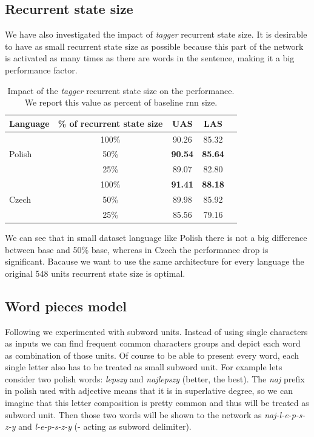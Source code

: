 \subsection{Recurrent state size}
We have also investigated the impact of \emph{tagger} recurrent state size.
It is desirable to have as small recurrent state size as possible because this
part of the network is activated as many times as there are words in the sentence,
making it a big performance factor.

\begin{table}[!htbp]
    \centering
    \begin{tabular}{l c c c c}
        Language & \% of recurrent state size & UAS & LAS \\ \hline
        \multirow{3}{*}{Polish}& 100\% & 90.26 & 85.32 \\
        & 50\% & \textbf{90.54} & \textbf{85.64} \\
        & 25\% & 89.07 & 82.80 \\ \hline
        \multirow{3}{*}{Czech}& 100\% & \textbf{91.41} & \textbf{88.18}\\
        & 50\% & 89.98 & 85.92\\
        & 25\% & 85.56 & 79.16\\ \hline%
    \end{tabular}
    \label{tab:birnn_single_size}
    \caption{Impact of the \emph{tagger} recurrent state size on the performance.
    We report this value as percent of baseline rnn size.}
\end{table}

We can see that in small dataset language like Polish there is not a big difference
between base and 50\% base, whereas in Czech the performance drop is significant.
Bacause we want to use the same architecture for every language the original 548
units recurrent state size is optimal.

\subsection{Word pieces model}
Following \cite{sennrich_subword_2015} we experimented with subword units.
Instead of using single characters as inputs we can find frequent common characters groups and
depict each word as combination of those units. Of course to be able to
present every word, each single letter also has to be treated as small subword unit. 
For example lets consider two polish words: \emph{lepszy} and \emph{najlepszy} (better, the best).
The \emph{naj} prefix in polish used with adjective means that it is in superlative degree,
so we can imagine that this letter composition is pretty common and thus will be
treated as subword unit. Then those two words will be shown to the network as
\emph{naj-l-e-p-s-z-y} and \emph{l-e-p-s-z-y} (- acting as subword delimiter).

